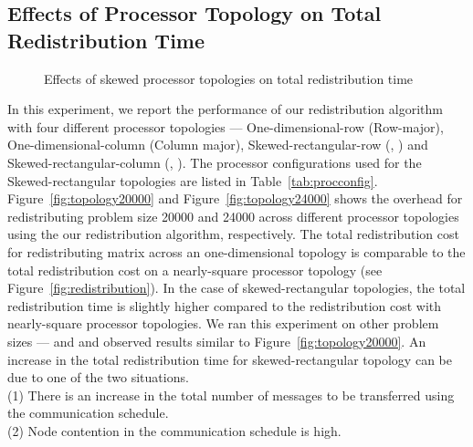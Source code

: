 \documentclass[letterpaper]{llncs}
\begin{document}
\subsection{Effects of Processor Topology on Total Redistribution Time}
\begin{figure}[ht]
\caption{Effects of skewed processor topologies on total redistribution time}
\end{figure}

\vspace{-0.02in}
In this experiment, we report the performance of our redistribution algorithm with four different processor topologies --- One-dimensional-row (Row-major), 
One-\-dim\-ensional-column (Column major), Skewed-rectangular-row (, ) and 
Skewed-rectangular-column (, ).
 The processor configurations used for the Skewed-rectangular topologies are listed in Table~\ref{tab:procconfig}.
Figure~\ref{fig:topology20000} and Figure~\ref{fig:topology24000} shows the overhead for
redistributing problem size 20000 and 24000
across different processor topologies using the our redistribution algorithm, respectively.
The total redistribution cost for redistributing  matrix across an one-dimensional topology is  comparable to the total redistribution cost on a nearly-square processor topology (see Figure~\ref{fig:redistribution}). 
In the case of skewed-rectangular topologies,  the  total redistribution time is slightly higher compared to the redistribution cost with nearly-square processor topologies. We ran this experiment on other problem sizes ---  and  and observed results similar to Figure~\ref{fig:topology20000}.
An increase in  the total redistribution time for skewed-rectangular topology can be due to one of the two situations. \\
(1) There is an increase in the total number of messages to be transferred using the communication schedule. \\
(2) Node contention in the communication schedule is high.\\ 
\end{document}
